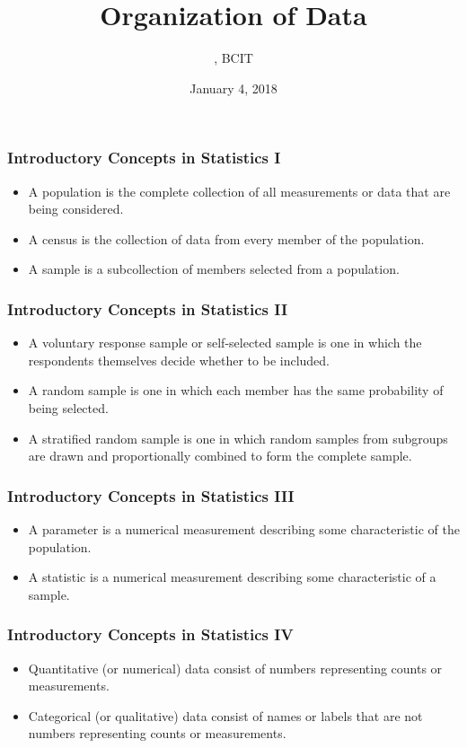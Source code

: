 \documentclass[xcolor=dvipsnames]{beamer}
\title{Organization of Data}
\subtitle{{\CourseNumber}, BCIT}
\author{\CourseName}
\date{January 4, 2018}
\begin{document}
\begin{frame}
  \titlepage
\end{frame}

\begin{frame}
  \frametitle{Introductory Concepts in Statistics I}
  \begin{itemize}
  \item<1-> A \alert{population} is the complete collection of all
    measurements or data that are being considered.
  \item<2-> A \alert{census} is the collection of data from every
    member of the population.
  \item<3-> A \alert{sample} is a subcollection of members selected
    from a population.
  \end{itemize}
\end{frame}

\begin{frame}
  \frametitle{Introductory Concepts in Statistics II}
  \begin{itemize}
  \item<1-> A \alert{voluntary response sample} or
    \alert{self-selected sample} is one in which the respondents
    themselves decide whether to be included.
  \item<2-> A \alert{random sample} is one in which each member has
    the same probability of being selected.
  \item<3-> A \alert{stratified random sample} is one in which random
    samples from subgroups are drawn and proportionally combined to
    form the complete sample.
  \end{itemize}
\end{frame}

\begin{frame}
  \frametitle{Introductory Concepts in Statistics III}
  \begin{itemize}
  \item<1-> A \alert{parameter} is a numerical measurement describing
    some characteristic of the population.
  \item<2-> A \alert{statistic} is a numerical measurement describing
    some characteristic of a sample.
  \end{itemize}
\end{frame}

\begin{frame}
  \frametitle{Introductory Concepts in Statistics IV}
  \begin{itemize}
  \item<1-> \alert{Quantitative} (or \alert{numerical}) data consist
    of numbers representing counts or measurements.
  \item<2-> \alert{Categorical} (or \alert{qualitative}) data consist
    of names or labels that are not numbers representing counts or
    measurements.
  \end{itemize}
\end{frame}
\end{document}

